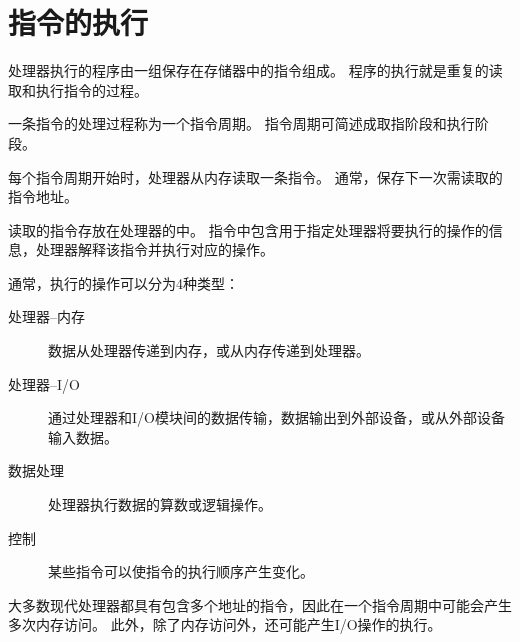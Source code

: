 
\section{指令的执行}
{
    处理器执行的程序由一组保存在存储器中的指令组成。
    程序的执行就是重复的读取和执行指令的过程。

    一条指令的处理过程称为一个指令周期。
    指令周期可简述成取指阶段和执行阶段。

    每个指令周期开始时，处理器从内存读取一条指令。
    通常，保存下一次需读取的指令地址。

    读取的指令存放在处理器的中。
    指令中包含用于指定处理器将要执行的操作的信息，处理器解释该指令并执行对应的操作。

    通常，执行的操作可以分为4种类型：

    \begin{description}
        \item[处理器--内存] 数据从处理器传递到内存，或从内存传递到处理器。
        \item[处理器--I/O] 通过处理器和I/O模块间的数据传输，数据输出到外部设备，或从外部设备输入数据。
        \item[数据处理] 处理器执行数据的算数或逻辑操作。
        \item[控制] 某些指令可以使指令的执行顺序产生变化。
    \end{description}

    大多数现代处理器都具有包含多个地址的指令，因此在一个指令周期中可能会产生多次内存访问。
    此外，除了内存访问外，还可能产生I/O操作的执行。
}